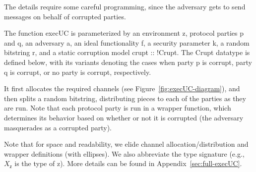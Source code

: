 The details require some careful programming, since the
adversary gets to send messages on behalf of corrupted parties.

\noindent
The function \textsf{execUC} is parameterized by an environment \textsf{z},
protocol parties \textsf{p} and \textsf{q}, an adversary \textsf{a}, an ideal
functionality \textsf{f}, a security parameter \textsf{k}, a random bitstring
\textsf{r}, and a static corruption model \textsf{crupt :: !Crupt}. The
\textsf{Crupt} datatype is defined below, with its variants denoting the cases
when party \textsf{p} is corrupt, party \textsf{q} is corrupt, or no party is
corrupt, respectively.



\noindent It first allocates the required channels (see
Figure~\ref{fig:execUC-diagram}), and then splits a random bitstring,
distributing pieces to each of the parties as they are run.  Note that each
protocol party is run in a wrapper function, which determines its behavior based
on whether or not it is corrupted (the adversary masquerades as a corrupted
party).

Note that for space and readability, we elide channel allocation/distribution
and wrapper definitions (with ellipses). We also abbreviate the type signature
(e.g., $X_{\mathsf{z}}$ is the type of \textsf{z}). More details can be found in
Appendix~\ref{sec:full-execUC}.


